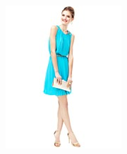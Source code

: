 \documentclass[11pt]{article}
\begin{document}
\begin{figure}
\begin{subfigure}{.18\textwidth}
\label{fig:sub2}
\end{subfigure}
\begin{subfigure}{.18\textwidth}
\centering
\includegraphics[width=\linewidth]{concepts/concept2_neg3.jpg}
\label{fig:sub2}
\end{subfigure}
\begin{subfigure}{.18\textwidth}
\centering

\end{subfigure}
\end{figure}
\end{document}
